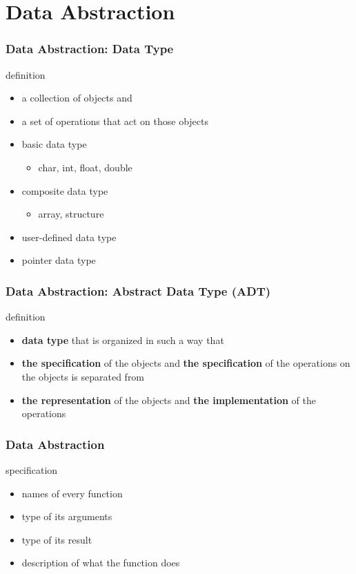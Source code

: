 \documentclass[newPxFont,sthlmFooter,nooffset]{beamer}
\begin{document}
\section{Data Abstraction}
\begin{frame}[t]
  \frametitle{Data Abstraction: Data Type}
definition
\begin{itemize}
\item a collection of objects and
\item a set of operations that act on
  those objects
\end{itemize}

\begin{itemize}
\item basic data type
  \begin{itemize}
  \item char, int, float, double
  \end{itemize}

\item composite data type
  \begin{itemize}
  \item array, structure
  \end{itemize}
\item user-defined data type
\item pointer data type
\end{itemize}

\end{frame}

\begin{frame}[t]
  \frametitle{Data Abstraction: Abstract Data Type (ADT)}
definition
\begin{itemize}
\item \textbf{data type} that is organized in such a way that
\item \textbf{the specification} of the objects and \textbf{the specification} of the operations on the objects is separated from
\item  \textbf{the representation} of the objects and \textbf{the implementation} of the operations
\end{itemize}


\end{frame}
\begin{frame}[t]
  \frametitle{Data Abstraction}
specification
\begin{itemize}
\item  names of every function
\item type of its arguments
\item type of its result
\item description of what the function does
\end{itemize}

\end{frame}
\end{document}
